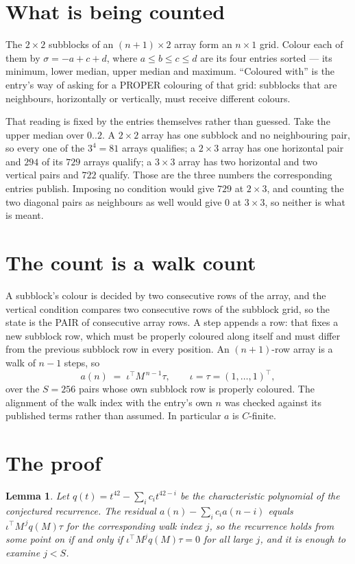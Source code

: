 \documentclass[11pt,a4paper]{article}
\theoremstyle{plain}
\newtheorem{lemma}[theorem]{Lemma}
\theoremstyle{definition}
\begin{document}
\section{What is being counted}

The $2\times2$ subblocks of an $(n+1)\times2$ array form an
$n\times1$ grid. Colour each of them by $\sigma=-a+c+d$, where $a\le b\le c\le d$ are its four entries sorted --- its minimum, lower median, upper median and maximum. ``Coloured with'' is the entry's way of
asking for a PROPER colouring of that grid: subblocks that are neighbours, horizontally or
vertically, must receive different colours.

That reading is fixed by the entries themselves rather than guessed. Take the upper median
over $0..2$. A $2\times2$ array has one subblock and no neighbouring pair, so every one of the
$3^4=81$ arrays qualifies; a $2\times3$ array has one horizontal pair and $294$ of its $729$
arrays qualify; a $3\times3$ array has two horizontal and two vertical pairs and $722$
qualify. Those are the three numbers the corresponding entries publish. Imposing no condition
would give $729$ at $2\times3$, and counting the two diagonal pairs as neighbours as well
would give $0$ at $3\times3$, so neither is what is meant.

\section{The count is a walk count}

A subblock's colour is decided by two consecutive rows of the array, and
the vertical condition compares two consecutive rows of the subblock grid, so the state is the
PAIR of consecutive array rows. A step appends a row: that fixes a new subblock row, which
must be properly coloured along itself and must differ from the previous subblock row in every
position. An $(n+1)$-row array is a walk of $n-1$ steps, so
\[
a(n)\;=\;\iota^{\!\top}M^{\,n-1}\tau,\qquad\iota=\tau=(1,\dots,1)^{\!\top},
\]
over the $S=256$ pairs whose own subblock row is properly coloured.
The alignment of the walk index with the entry's own $n$ was checked against its published
terms rather than assumed. In particular $a$ is $C$-finite.

\section{The proof}

\begin{lemma}\label{lem:crit}
Let $q(t)=t^{42}-\sum_i c_it^{42-i}$ be the characteristic polynomial of the
conjectured recurrence. The residual $a(n)-\sum_ic_ia(n-i)$ equals
$\iota^{\!\top}M^{\,j}q(M)\tau$ for the corresponding walk index $j$, so the recurrence
holds from some point on if and only if $\iota^{\!\top}M^{j}q(M)\tau=0$ for all large $j$,
and it is enough to examine $j<S$.
\end{lemma}
\end{document}

